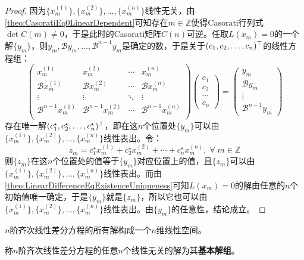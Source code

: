 \begin{proof}
	因为$\{x_m^{(1)}\},\{x_m^{(2)}\},\dots,\{x_m^{(n)}\}$线性无关，由\cref{theo:CasoratiEq0LinearDependent}可知存在$m\in\mathbb{Z}$使得Casorati行列式$\det C(m)\ne0$，于是此时的Casorati矩阵$C(n)$可逆。任取$L(x_m)=0$的一个解$\{y_m\}$，则$y_m,\mathcal{B}y_m,\dots,\mathcal{B}^{n-1}y_m$是确定的数，于是关于$(c_1, c_2, \dots, c_{n})^{\top}$的线性方程组：
	\begin{equation*}
		\begin{pmatrix}
			x_m^{(1)} & x_m^{(2)} & \cdots & x_m^{(n)} \\
			\mathcal{B}x_m^{(1)} & \mathcal{B}x_m^{(2)} & \cdots & \mathcal{B}x_m^{(n)} \\
			\vdots & \vdots & \ddots & \vdots \\
			\mathcal{B}^{n-1}x_m^{(1)} & \mathcal{B}^{n-1}x_m^{(2)} & \cdots & \mathcal{B}^{n-1}x_m^{(n)} \\
		\end{pmatrix}
		\begin{pmatrix}
			c_1 \\
			c_2 \\
			\cdots \\
			c_n
		\end{pmatrix}=
		\begin{pmatrix}
			y_m \\
			\mathcal{B}y_m \\
			\vdots \\
			\mathcal{B}^{n-1}y_m
		\end{pmatrix}
	\end{equation*}
	存在唯一解$(c^{\star}_1, c^{\star}_2, \dots, c^{\star}_{n})^{\top}$，即在这$n$个位置处$\{y_m\}$可以由$\{x_m^{(1)}\},\{x_m^{(2)}\},\dots,\{x_m^{(n)}\}$线性表出。令：
	\begin{equation*}
		z_m=c_1^{\star}x_m^{(1)}+c_2^{\star}x_m^{(2)}+\cdots+c_n^{\star}x_m^{(n)},\;\forall\;m\in\mathbb{Z}
	\end{equation*}
	则$\{z_m\}$在这$n$个位置处的值等于$\{y_m\}$对应位置上的值，且$\{z_m\}$可以由$\{x_m^{(1)}\},\{x_m^{(2)}\},\dots,\{x_m^{(n)}\}$线性表出。而由\cref{theo:LinearDifferenceEqExistenceUniqueness}可知$L(x_m)=0$的解由任意的$n$个初始值唯一确定，于是$\{y_m\}$就是$\{z_m\}$，所以它也可以由$\{x_m^{(1)}\},\{x_m^{(2)}\},\dots,\{x_m^{(n)}\}$线性表出。由$\{y_m\}$的任意性，结论成立。
\end{proof}
\begin{corollary}\label{cor:LinearSpaceSolutionHomogeneousLinearDifferenceEquation}
	$n$阶齐次线性差分方程的所有解构成一个$n$维线性空间。
\end{corollary}
\begin{definition}
	称$n$阶齐次线性差分方程的任意$n$个线性无关的解为其\textbf{基本解组}。
\end{definition}
